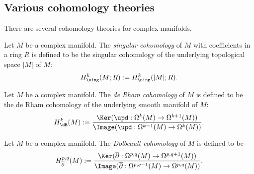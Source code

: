 \subsection{Various cohomology theories}


    There are several cohomology theories for complex manifolds.

    \begin{definition}\label{def:singular_cohomology_on_complex_manifolds}
        Let \(M\) be a complex manifold.
        The \emph{singular cohomology} of \(M\) with coefficients in a ring \(R\) is defined to be the singular cohomology of the underlying topological space \(|M|\) of \(M\):
        \[ H^k_{\sing}(M; R) := H^k_{\sing}(|M|; R). \]
    \end{definition}

    \begin{definition}\label{def:de_rham_cohomology_of_complex_manifold}
        Let \(M\) be a complex manifold.
        The \emph{de Rham cohomology} of \(M\) is defined to be the de Rham cohomology of the underlying smooth manifold of \(M\):
        \[ H^k_{\dR}(M) := \frac{\Ker(\upd: \Omega^k(M) \to \Omega^{k+1}(M))}{\Image(\upd: \Omega^{k-1}(M) \to \Omega^k(M))}. \]
    \end{definition}


    \begin{definition}\label{def:dolbeault_cohomology_of_complex_manifold}
        Let \(M\) be a complex manifold.
        The \emph{Dolbeault cohomology} of \(M\) is defined to be
        \[ H^{p,q}_{\overline{\partial}}(M) := \frac{\Ker(\overline{\partial}: \Omega^{p,q}(M) \to \Omega^{p,q+1}(M))}{\Image(\overline{\partial}: \Omega^{p,q-1}(M) \to \Omega^{p,q}(M))}. \]
    \end{definition}


